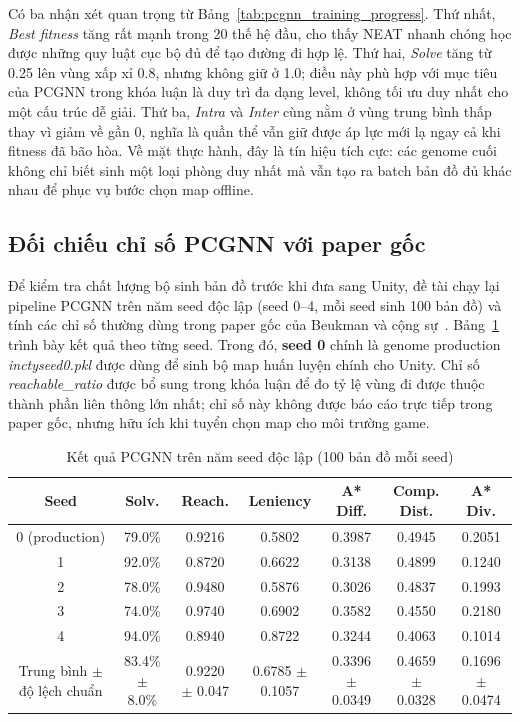Có ba nhận xét quan trọng từ Bảng~\ref{tab:pcgnn_training_progress}. Thứ nhất, \textit{Best fitness} tăng rất mạnh trong 20 thế hệ đầu, cho thấy NEAT nhanh chóng học được những quy luật cục bộ đủ để tạo đường đi hợp lệ. Thứ hai, \textit{Solve} tăng từ 0.25 lên vùng xấp xỉ 0.8, nhưng không giữ ở 1.0; điều này phù hợp với mục tiêu của PCGNN trong khóa luận là duy trì đa dạng level, không tối ưu duy nhất cho một cấu trúc dễ giải. Thứ ba, \textit{Intra} và \textit{Inter} cùng nằm ở vùng trung bình thấp thay vì giảm về gần 0, nghĩa là quần thể vẫn giữ được áp lực mới lạ ngay cả khi fitness đã bão hòa. Về mặt thực hành, đây là tín hiệu tích cực: các genome cuối không chỉ biết sinh một loại phòng duy nhất mà vẫn tạo ra batch bản đồ đủ khác nhau để phục vụ bước chọn map offline.

\subsection{Đối chiếu chỉ số PCGNN với paper gốc}

Để kiểm tra chất lượng bộ sinh bản đồ trước khi đưa sang Unity, đề tài chạy lại pipeline PCGNN trên năm seed độc lập (seed 0--4, mỗi seed sinh 100 bản đồ) và tính các chỉ số thường dùng trong paper gốc của Beukman và cộng sự~\cite{Beukman2022}. Bảng~\ref{tab:pcgnn_four_seed_metrics} trình bày kết quả theo từng seed. Trong đó, \textbf{seed 0} chính là genome production \emph{inctyseed0.pkl} được dùng để sinh bộ map huấn luyện chính cho Unity. Chỉ số \emph{reachable\_ratio} được bổ sung trong khóa luận để đo tỷ lệ vùng đi được thuộc thành phần liên thông lớn nhất; chỉ số này không được báo cáo trực tiếp trong paper gốc, nhưng hữu ích khi tuyển chọn map cho môi trường game.

\begin{table}[H]
    \centering
    \scriptsize
    \setlength{\tabcolsep}{4pt}
    \renewcommand{\arraystretch}{1.15}
    \caption{Kết quả PCGNN trên năm seed độc lập (100 bản đồ mỗi seed)}
    \label{tab:pcgnn_four_seed_metrics}
    \begin{tabular}{c c c c c c c}
        \toprule
        \textbf{Seed} & \textbf{Solv.} & \textbf{Reach.} & \textbf{Leniency} & \textbf{A* Diff.} & \textbf{Comp. Dist.} & \textbf{A* Div.} \\
        \midrule
        0 (production) & 79.0\% & 0.9216 & 0.5802 & 0.3987 & 0.4945 & 0.2051 \\
        1 & 92.0\% & 0.8720 & 0.6622 & 0.3138 & 0.4899 & 0.1240 \\
        2 & 78.0\% & 0.9480 & 0.5876 & 0.3026 & 0.4837 & 0.1993 \\
        3 & 74.0\% & 0.9740 & 0.6902 & 0.3582 & 0.4550 & 0.2180 \\
        4 & 94.0\% & 0.8940 & 0.8722 & 0.3244 & 0.4063 & 0.1014 \\
        \midrule
        Trung bình $\pm$ độ lệch chuẩn & 83.4\% $\pm$ 8.0\% & 0.9220 $\pm$ 0.047 & 0.6785 $\pm$ 0.1057 & 0.3396 $\pm$ 0.0349 & 0.4659 $\pm$ 0.0328 & 0.1696 $\pm$ 0.0474 \\
        \bottomrule
    \end{tabular}
\end{table}

